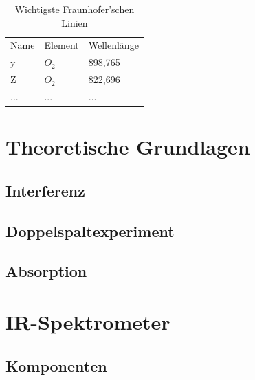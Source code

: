 \documentclass{article}
\begin{document}
\begin{table}[H]
    \centering
    \label{tab:wichtige-fraunhoferlinien}
    \begin{tabular}{l|l|l}
        Name & Element & Wellenlänge \\
        y    & $O_2$    & 898,765    \\
        Z    & $O_2$    & 822,696    \\
        ...  & ...      & ...
    \end{tabular}
    \caption{Wichtigste Fraunhofer'schen Linien}
\end{table}







\newpage
\section{Theoretische Grundlagen}


\subsection{Interferenz}


\subsection{Doppelspaltexperiment}


\subsection{Absorption}


\section{IR-Spektrometer}


\subsection{Komponenten}
\end{document}
